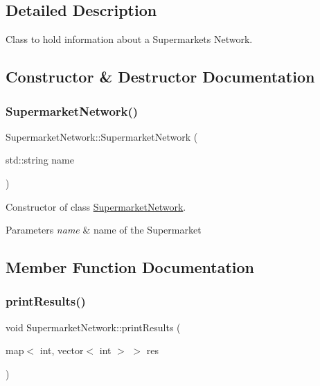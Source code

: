 \subsection{Detailed Description}
Class to hold information about a Supermarket\textquotesingle{}s Network. 

\subsection{Constructor \& Destructor Documentation}
\hypertarget{class_supermarket_network_afb289463b6137986f5ad6c26075c2f54}{}\label{class_supermarket_network_afb289463b6137986f5ad6c26075c2f54} 
\subsubsection{\texorpdfstring{Supermarket\+Network()}{SupermarketNetwork()}}
{\footnotesize\ttfamily Supermarket\+Network\+::\+Supermarket\+Network (\begin{DoxyParamCaption}\item[{std\+::string}]{name }\end{DoxyParamCaption})}



Constructor of class \hyperlink{class_supermarket_network}{Supermarket\+Network}. 


\begin{DoxyParams}{Parameters}
{\em name} & name of the Supermarket \\
\hline
\end{DoxyParams}


\subsection{Member Function Documentation}
\hypertarget{class_supermarket_network_a013ba8bf6d961cc2fefa0fa09bf8a2e7}{}\label{class_supermarket_network_a013ba8bf6d961cc2fefa0fa09bf8a2e7} 
\subsubsection{\texorpdfstring{print\+Results()}{printResults()}\hspace{0.1cm}{\footnotesize\ttfamily [1/2]}}
{\footnotesize\ttfamily void Supermarket\+Network\+::print\+Results (\begin{DoxyParamCaption}\item[{map$<$ int, vector$<$ int $>$ $>$}]{res }\end{DoxyParamCaption})}



